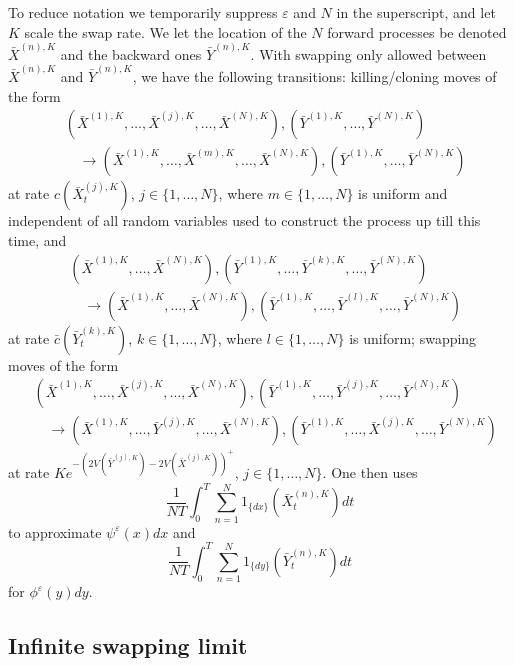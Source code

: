 \documentclass[english,11pt]{article}%
\numberwithin{equation}{section}
\numberwithin{example}{section}
\numberwithin{theorem}{section}
\begin{document}
To reduce notation we temporarily suppress $\varepsilon$ and $N$ in the
superscript, and let $K$ scale the swap rate. We let the location of the $N$
forward processes be denoted $\bar{X}^{(n),K}$ and the backward ones $\bar
{Y}^{(n),K}$. With swapping only allowed between $\bar{X}^{(n),K}$ and
$\bar{Y}^{(n),K}$, we have the following transitions: killing/cloning moves of
the form%
\begin{align*}
&  (\bar{X}^{(1),K},\ldots,\bar{X}^{(j),K},\ldots,\bar{X}^{(N),K}),(\bar
{Y}^{(1),K},\ldots,\bar{Y}^{(N),K})\\
&  \quad\rightarrow(\bar{X}^{(1),K},\ldots,\bar{X}^{(m),K},\ldots,\bar
{X}^{(N),K}),(\bar{Y}^{(1),K},\ldots,\bar{Y}^{(N),K})
\end{align*}
at rate $c(\bar{X}_{t}^{(j),K})$, $j\in\{1,\ldots,N\}$, where $m\in
\{1,\ldots,N\}$ is uniform and independent of all random variables used to
construct the process up till this time, and
\begin{align*}
&  (\bar{X}^{(1),K},\ldots,\bar{X}^{(N),K}),(\bar{Y}^{(1),K},\ldots,\bar
{Y}^{(k),K},\ldots,\bar{Y}^{(N),K})\\
&  \quad\rightarrow(\bar{X}^{(1),K},\ldots,\bar{X}^{(N),K}),(\bar{Y}%
^{(1),K},\ldots,\bar{Y}^{(l),K},\ldots,\bar{Y}^{(N),K})
\end{align*}
at rate $\bar{c}(\bar{Y}_{t}^{(k),K})$, $k\in\{1,\ldots,N\}$, where
$l\in\{1,\ldots,N\}$ is uniform; swapping moves of the form
\begin{align*}
&  (\bar{X}^{(1),K},\ldots,\bar{X}^{(j),K},\ldots,\bar{X}^{(N),K}),(\bar
{Y}^{(1),K},\ldots,\bar{Y}^{(j),K},\ldots,\bar{Y}^{(N),K})\\
&  \quad\rightarrow(\bar{X}^{(1),K},\ldots,\bar{Y}^{(j),K},\ldots,\bar
{X}^{(N),K}),(\bar{Y}^{(1),K},\ldots,\bar{X}^{(j),K},\ldots,\bar{Y}^{(N),K})
\end{align*}
at rate $Ke^{-(2V(\bar{Y}^{(j),K})-2V(\bar{X}^{(j),K}))^{+}}$, $j\in
\{1,\ldots,N\}$. One then uses
\[
\frac{1}{NT}\int_{0}^{T}\sum_{n=1}^{N}1_{\{dx\}}(\bar{X}_{t}^{(n),K})dt
\]
to approximate $\psi^{\varepsilon}(x)dx$ and
\[
\frac{1}{NT}\int_{0}^{T}\sum_{n=1}^{N}1_{\{dy\}}(\bar{Y}_{t}^{(n),K})dt
\]
for $\phi^{\varepsilon}(y)dy$.

\subsection{Infinite swapping limit}
\end{document}
